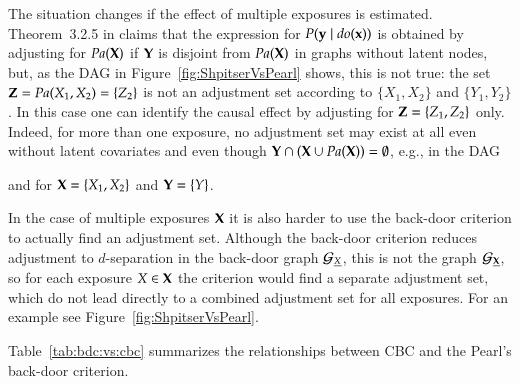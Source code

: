 The situation changes if the effect of multiple exposures  
is estimated. Theorem~3.2.5 in \citet{Pearl2009} claims that 
the expression for $P({\bf y} \mid \textit{do}({\bf x}))$  is obtained 
by adjusting for $\textit{Pa}({\bf X})$ if 
${\bf Y}$ is disjoint from $ %
\textit{Pa}(\bX)$ in graphs without latent nodes, but,
as the DAG in Figure~\ref{fig:ShpitserVsPearl} shows, this is not true: 
the set ${\bf Z}=\textit{Pa}(X_1,X_2) = \{Z_2\}$ is not an adjustment set 
according to $\{X_1,X_2\}$ and $\{Y_1,Y_2\}$. In this case one can identify
the causal effect
by adjusting for 
${\bf Z}=\{Z_1,Z_2\}$ only. Indeed, for more than
one exposure, no adjustment set may exist at all even
without latent covariates and even though
${\bf Y} \cap ({\bf X}\cup \textit{Pa}({\bf X})) = \emptyset$, 
e.g., in the DAG
and for ${\bf X}=\{X_1,X_2\}$ and ${\bf Y}=\{Y\}$.

In the case of multiple exposures ${\bf X}$ it is also harder to use the back-door criterion to actually find an adjustment set. 
Although the back-door criterion reduces adjustment to $d$-separation in the back-door graph ${\cal G}_{\underline{X}}$, 
this is not the graph  ${\cal G}_{\underline{{\bf X}}}$, so for each exposure $X \in {\bf X}$ the criterion would find a separate 
adjustment set, which do not lead directly to a combined adjustment set for all exposures.
For an example see Figure~\ref{fig:ShpitserVsPearl}. 
%

Table~\ref{tab:bdc:vs:cbc} summarizes the relationships between CBC and the Pearl's back-door criterion.

